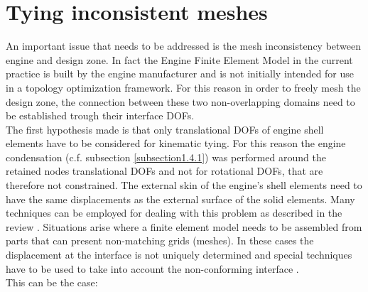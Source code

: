 \section{Tying inconsistent meshes}
\label{sec1.3}
An important issue that needs to be addressed is the mesh inconsistency between engine and design zone. In fact the Engine Finite Element Model in the current practice is built by the engine manufacturer and is not initially intended for use in a topology optimization framework. For this reason in order to freely mesh the design zone, the connection between these two non-overlapping domains need to be established trough their interface DOFs.\\
 The first hypothesis made is that only translational DOFs of engine shell elements have to be considered for kinematic tying. For this reason the engine condensation (c.f. subsection \ref{subsection1.4.1}) was performed around the retained nodes translational DOFs and not for rotational DOFs, that are therefore not constrained. The external skin of the engine's shell elements need to have the same displacements as the external surface of the solid elements. Many techniques can be employed for dealing with this problem as described in the review \cite{coniglio2018weighted}. Situations arise where a finite element model needs to be assembled from parts that can present non-matching grids (meshes). In these cases the displacement at the interface is not uniquely determined and special techniques have to be used to take into account the non-conforming interface \cite{mcgee2005non}. \\
 This can be the case:
